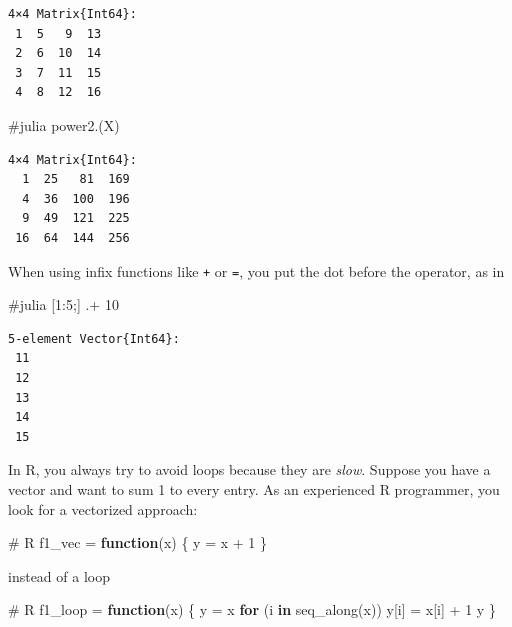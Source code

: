 \documentclass[
  letterpaper,
  DIV=11,
  numbers=noendperiod]{scrartcl}
\newenvironment{Shaded}{\begin{snugshade}}{\end{snugshade}}
\newcommand{\CommentTok}[1]{\textcolor[rgb]{0.37,0.37,0.37}{#1}}
\newcommand{\ControlFlowTok}[1]{\textcolor[rgb]{0.00,0.23,0.31}{\textbf{#1}}}
\newcommand{\DecValTok}[1]{\textcolor[rgb]{0.68,0.00,0.00}{#1}}
\newcommand{\FloatTok}[1]{\textcolor[rgb]{0.68,0.00,0.00}{#1}}
\newcommand{\FunctionTok}[1]{\textcolor[rgb]{0.28,0.35,0.67}{#1}}
\newcommand{\NormalTok}[1]{\textcolor[rgb]{0.00,0.23,0.31}{#1}}
\newcommand{\OperatorTok}[1]{\textcolor[rgb]{0.37,0.37,0.37}{#1}}
\newcommand{\OtherTok}[1]{\textcolor[rgb]{0.00,0.23,0.31}{#1}}
\newcommand{\SpecialCharTok}[1]{\textcolor[rgb]{0.37,0.37,0.37}{#1}}
\begin{document}
\begin{verbatim}
4×4 Matrix{Int64}:
 1  5   9  13
 2  6  10  14
 3  7  11  15
 4  8  12  16
\end{verbatim}

\begin{Shaded}
\begin{Highlighting}[]
\CommentTok{\#julia}
\FunctionTok{power2}\NormalTok{.(X)}
\end{Highlighting}
\end{Shaded}

\begin{verbatim}
4×4 Matrix{Int64}:
  1  25   81  169
  4  36  100  196
  9  49  121  225
 16  64  144  256
\end{verbatim}

When using infix functions like \texttt{+} or \texttt{=}, you put the
dot before the operator, as in

\begin{Shaded}
\begin{Highlighting}[]
\CommentTok{\#julia}
\NormalTok{[}\FloatTok{1}\OperatorTok{:}\FloatTok{5}\NormalTok{;] }\OperatorTok{.+} \FloatTok{10}
\end{Highlighting}
\end{Shaded}

\begin{verbatim}
5-element Vector{Int64}:
 11
 12
 13
 14
 15
\end{verbatim}

In R, you always try to avoid loops because they are \emph{slow}.
Suppose you have a vector and want to sum 1 to every entry. As an
experienced R programmer, you look for a vectorized approach:

\begin{Shaded}
\begin{Highlighting}[]
\CommentTok{\# R}
\NormalTok{f1\_vec }\OtherTok{=} \ControlFlowTok{function}\NormalTok{(x) \{}
\NormalTok{    y }\OtherTok{=}\NormalTok{ x }\SpecialCharTok{+} \DecValTok{1}
\NormalTok{\}}
\end{Highlighting}
\end{Shaded}

instead of a loop

\begin{Shaded}
\begin{Highlighting}[]
\CommentTok{\# R}
\NormalTok{f1\_loop }\OtherTok{=} \ControlFlowTok{function}\NormalTok{(x) \{}
\NormalTok{    y }\OtherTok{=}\NormalTok{ x}
    \ControlFlowTok{for}\NormalTok{ (i }\ControlFlowTok{in} \FunctionTok{seq\_along}\NormalTok{(x)) y[i] }\OtherTok{=}\NormalTok{ x[i] }\SpecialCharTok{+} \DecValTok{1}
\NormalTok{    y}
\NormalTok{\}}
\end{Highlighting}
\end{Shaded}
\end{document}
